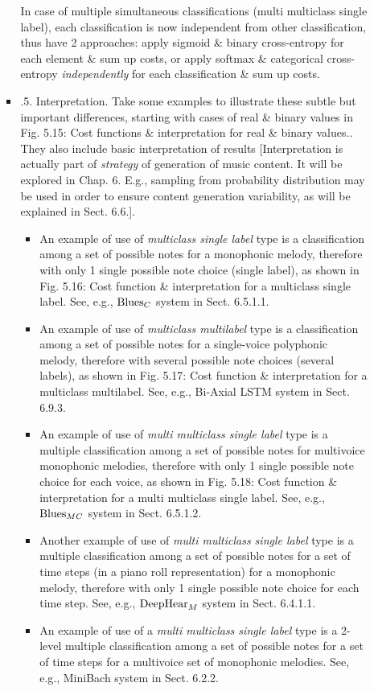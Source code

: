 \documentclass{article}
\begin{document}
\begin{itemize}
\begin{itemize}
\begin{itemize}
			In case of multiple simultaneous classifications (multi multiclass single label), each classification is now independent from other classification, thus have 2 approaches: apply sigmoid \& binary cross-entropy for each element \& sum up costs, or apply softmax \& categorical cross-entropy {\it independently} for each classification \& sum up costs.
			\item {.5. Interpretation.} Take some examples to illustrate these subtle but important differences, starting with cases of real \& binary values in {\sf Fig. 5.15: Cost functions \& interpretation for real \& binary values.}. They also include basic interpretation of results [Interpretation is actually part of {\it strategy} of generation of music content. It will be explored in Chap. 6. E.g., sampling from probability distribution may be used in order to ensure content generation variability, as will be explained in Sect. 6.6.].
			\begin{itemize}
				\item An example of use of {\it multiclass single label} type is a classification among a set of possible notes for a monophonic melody, therefore with only 1 single possible note choice (single label), as shown in {\sf Fig. 5.16: Cost function \& interpretation for a multiclass single label.} See, e.g., ${\rm Blues}_C$ system in Sect. 6.5.1.1.
				\item An example of use of {\it multiclass multilabel} type is a classification among a set of possible notes for a single-voice polyphonic melody, therefore with several possible note choices (several labels), as shown in {\sf Fig. 5.17: Cost function \& interpretation for a multiclass multilabel}. See, e.g., Bi-Axial LSTM system in Sect. 6.9.3.
				\item An example of use of {\it multi multiclass single label} type is a multiple classification among a set of possible notes for multivoice monophonic melodies, therefore with only 1 single possible note choice for each voice, as shown in {\sf Fig. 5.18: Cost function \& interpretation for a multi multiclass single label.} See, e.g., ${\rm Blues}_{MC}$ system in Sect. 6.5.1.2.
				\item Another example of use of {\it multi multiclass single label} type is a multiple classification among a set of possible notes for a set of time steps (in a piano roll representation) for a monophonic melody, therefore with only 1 single possible note choice for each time step. See, e.g., ${\rm DeepHear}_M$ system in Sect. 6.4.1.1.
				\item An example of use of a {\it multi multiclass single label} type is a 2-level multiple classification among a set of possible notes for a set of time steps for a multivoice set of monophonic melodies. See, e.g., MiniBach system in Sect. 6.2.2.

\end{itemize}
\end{itemize}
\end{itemize}
\end{itemize}
\end{document}
